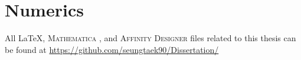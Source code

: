 
\chapter{Numerics}
\label{sec:ap8}


All \LaTeX, \textsc{Mathematica} , and \textsc{Affinity Designer}  files related to this thesis can be found at \href{https://github.com/seungtaek90/Dissertation/}{https://github.com/seungtaek90/Dissertation/}